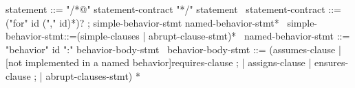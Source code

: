 \begin{syntax}
  statement ::= "/*@" statement-contract "*/" statement
  \
  statement-contract ::= {("for" id ("," id)*)?} ;
    simple-behavior-stmt named-behavior-stmt*
  \
  simple-behavior-stmt::=(simple-clauses | abrupt-clause-stmt)*
  \
  named-behavior-stmt ::= "behavior" id ":" behavior-body-stmt
  \
  behavior-body-stmt ::= (assumes-clause |
                     {[not implemented in a named behavior]requires-clause} ;
                    | assigns-clause | ensures-clause ;
                    | abrupt-clauses-stmt) *
\end{syntax}
